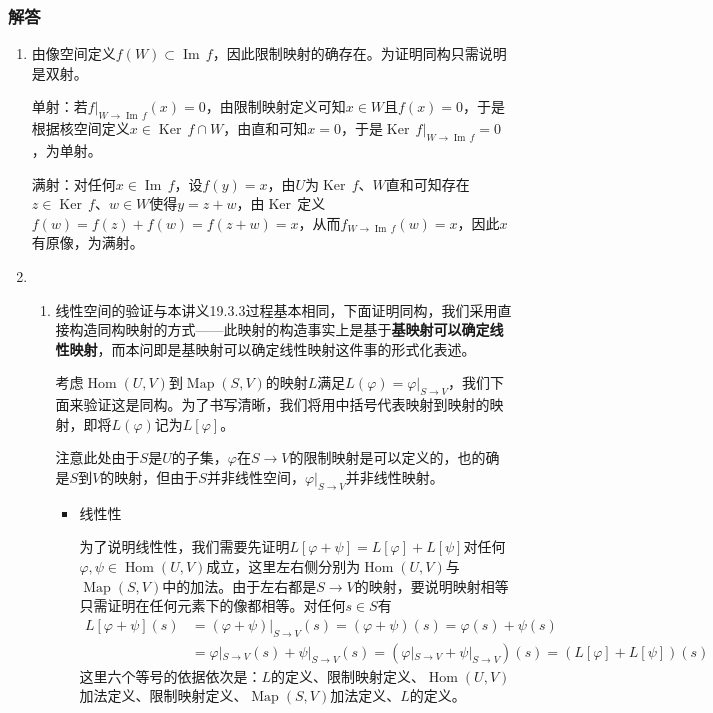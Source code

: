 \documentclass[a4paper,UTF8,fontset=windows,AutoFakeBold]{ctexart}
\DeclareMathOperator{\im}{Im\,}
\DeclareMathOperator{\Ker}{Ker\,}
\DeclareMathOperator{\Hom}{Hom}
\DeclareMathOperator{\Map}{Map}
\newcommand*{\note}{\noindent *}
\begin{document}
\subsubsection{解答}
\begin{enumerate}
    \item 由像空间定义$f(W)\subset\im f$，因此限制映射的确存在。为证明同构只需说明是双射。
    
    单射：若$f|_{W\to\im f}(x)=0$，由限制映射定义可知$x\in W$且$f(x)=0$，于是根据核空间定义$x\in\Ker f\cap W$，由直和可知$x=0$，于是$\Ker f|_{W\to\im f}=0$，为单射。

    满射：对任何$x\in\im f$，设$f(y)=x$，由$U$为$\Ker f$、$W$直和可知存在$z\in\Ker f$、$w\in W$使得$y=z+w$，由$\Ker$定义$f(w)=f(z)+f(w)=f(z+w)=x$，从而$f_{W\to\im f}(w)=x$，因此$x$有原像，为满射。

    \item
    \begin{enumerate}
        \item 线性空间的验证与本讲义19.3.3过程基本相同，下面证明同构，我们采用直接构造同构映射的方式——此映射的构造事实上是基于\textbf{基映射可以确定线性映射}，而本问即是基映射可以确定线性映射这件事的形式化表述。
        
        考虑$\Hom(U,V)$到$\Map(S,V)$的映射$L$满足$L(\varphi)=\varphi|_{S\to V}$，我们下面来验证这是同构。为了书写清晰，我们将用中括号代表映射到映射的映射，即将$L(\varphi)$记为$L[\varphi]$。
        
        \note 注意此处由于$S$是$U$的子集，$\varphi$在$S\to V$的限制映射是可以定义的，也的确是$S$到$V$的映射，但由于$S$并非线性空间，$\varphi|_{S\to V}$并非线性映射。

        \begin{itemize}
            \item 线性性
            
            为了说明线性性，我们需要先证明$L[\varphi+\psi]=L[\varphi]+L[\psi]$对任何$\varphi,\psi\in\Hom(U,V)$成立，这里左右侧分别为$\Hom(U,V)$与$\Map(S,V)$中的加法。由于左右都是$S\to V$的映射，要说明映射相等只需证明在任何元素下的像都相等。对任何$s\in S$有
            $$\begin{aligned}L[\varphi+\psi](s)&=(\varphi+\psi)|_{S\to V}(s)=(\varphi+\psi)(s)=\varphi(s)+\psi(s)\\ &=\varphi|_{S\to V}(s)+\psi|_{S\to V}(s)=(\varphi|_{S\to V}+\psi|_{S\to V})(s)=(L[\varphi]+L[\psi])(s)\end{aligned}$$
            这里六个等号的依据依次是：$L$的定义、限制映射定义、$\Hom(U,V)$加法定义、限制映射定义、$\Map(S,V)$加法定义、$L$的定义。


\end{itemize}
\end{enumerate}
\end{enumerate}
\end{document}
